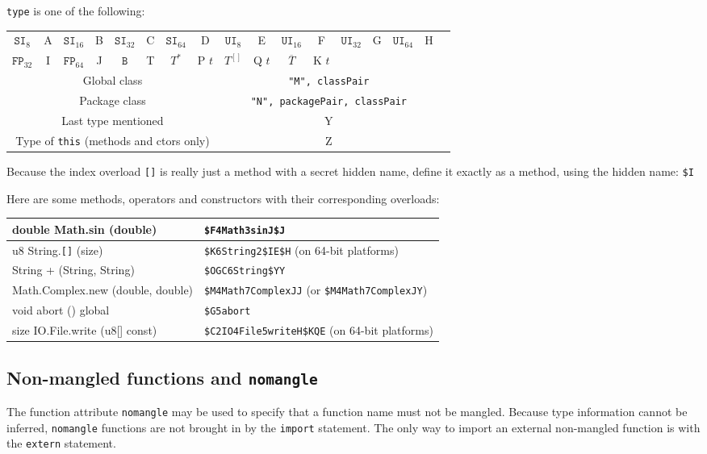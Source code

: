 \documentclass{article}
\newcommand{\R}[1]{\mathtt{#1}}
\begin{document}
\texttt{type} is one of the following:
\begin{center}
\begin{tabular}{|cc|cc|cc|cc|cc|cc|cc|cc|l}
\cline{1-16}
$\R{SI}_8$ & A &
$\R{SI}_{16}$ & B &
$\R{SI}_{32}$ & C &
$\R{SI}_{64}$ & D &
$\R{UI}_8$ & E &
$\R{UI}_{16}$ & F &
$\R{UI}_{32}$ & G &
$\R{UI}_{64}$ & H & \\
$\R{FP}_{32}$ & I &
$\R{FP}_{64}$ & J &
$\R{B}$ & T &
$T^*$ & P $t$ &
$T^{[]}$ & Q $t$ &
$\overline{T}$ & K $t$ &&&& \\
\cline{1-16}
\multicolumn{8}{|c|}{Global class} &
\multicolumn{8}{c|}{\texttt{"M", classPair}} \\
\multicolumn{8}{|c|}{Package class} &
\multicolumn{8}{c|}{\texttt{"N", packagePair, classPair}} \\
\multicolumn{8}{|c|}{Last type mentioned} &
\multicolumn{8}{c|}{Y} \\
\multicolumn{8}{|c|}{Type of \texttt{this} (methods and ctors only)} &
\multicolumn{8}{c|}{Z} \\
\cline{1-16}
\end{tabular}
\end{center}

Because the index overload \texttt{[]} is really just a method with a
secret hidden name, define it exactly as a method, using the hidden name:
\texttt{\$I} %

Here are some methods, operators and constructors with their corresponding
overloads:
\begin{center}
\begin{tabular}{|l|l|}
\hline
double Math.sin (double) & \texttt{\$F4Math3sinJ\$J} \\ \hline
u8 String.\texttt{[]} (size) & \texttt{\$K6String2\$IE\$H} (on 64-bit platforms) \\ \hline
String + (String, String) & \texttt{\$OGC6String\$YY} \\ \hline
Math.Complex.new (double, double) & \texttt{\$M4Math7ComplexJJ} (or \texttt{\$M4Math7ComplexJY}) \\ \hline
void abort () global & \texttt{\$G5abort} \\ \hline
size IO.File.write (u8[] const) & \texttt{\$C2IO4File5writeH\$KQE} (on 64-bit platforms) \\ \hline
\end{tabular}
\end{center}

\subsection{Non-mangled functions and \texttt{nomangle}}
\label{sub:cconv:nomangle}
The function attribute \texttt{nomangle} may be used to specify that a function
name must not be mangled. Because type information cannot be inferred,
\texttt{nomangle} functions are not brought in by the \texttt{import} statement.
The only way to import an external non-mangled function is with the
\texttt{extern} statement.
\end{document}
